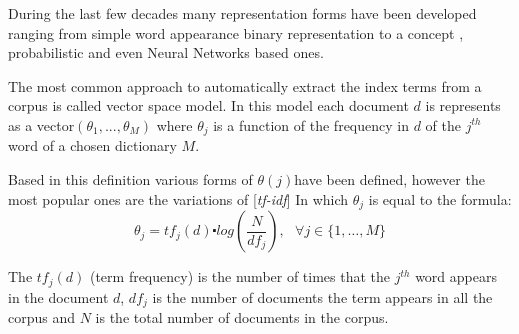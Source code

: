 During the last few decades many representation forms have been developed
ranging from simple word appearance binary representation to a concept
\cite{deerwester90indexing}, probabilistic and
even Neural Networks \cite{DBLP:conf/icann/KellerB05} based ones. 

The most common approach to automatically extract the index terms
from a corpus is called vector space model. In this
model each document $d$ is represents as a vector$(\theta_{1},...,\theta_{M})$
where $\theta_{j}$ is a function of the frequency in $d$ of the
$j^{th}$ word of a chosen dictionary $M$. 

Based in this definition various forms of $\theta(j)$have been defined,
however the most popular ones are the variations of [{\emph{tf-idf}}]  In
which $\theta_{j}$ is equal to the formula:
\begin{equation}
\theta_{j}=tf_{j}(d)\centerdot log(\frac{N}{df_{j}}),\,\,\,\,\forall j\in\{1,\ldots,M\}\label{eq:tf-idf}\end{equation}

The $tf_{j}(d)$ (term frequency) is the number of times that the $j^{th}$ word appears
in the document $d$, $df_{j}$ is the number of documents the term
appears in all the corpus and $N$ is the total number of documents
in the corpus. 

